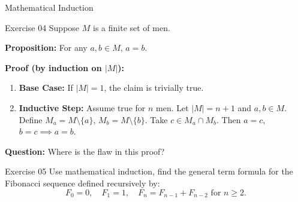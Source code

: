 \documentclass[dvipsnames]{beamer}
\theoremstyle{plain}
\theoremstyle{definition}
\begin{document}
\begin{frame}{Mathematical Induction}

\begin{block}{Exercise 04}
Suppose $M$ is a finite set of men.

\textbf{Proposition:} For any $a,b \in M$, $a = b$.

\textbf{Proof (by induction on $|M|$):}
\begin{enumerate}
    \item \textbf{Base Case:} If $|M|=1$, the claim is trivially true.
    \item \textbf{Inductive Step:} Assume true for $n$ men.  
    Let $|M| = n+1$ and $a,b \in M$.  
    Define $M_a = M \setminus \{a\}$, $M_b = M \setminus \{b\}$.  
    Take $c \in M_a \cap M_b$. Then $a = c$, $b = c \implies a = b$.
\end{enumerate}

\textbf{Question:} Where is the flaw in this proof?
\end{block}
\begin{block}{Exercise 05}
    Use mathematical induction, find the general term formula for the Fibonacci sequence defined recursively by:
    \[
    F_0 = 0, \quad F_1 = 1, \quad F_n = F_{n-1} + F_{n-2} \text{ for } n \ge 2.
    \]
\end{block}
\end{frame}
\end{document}
